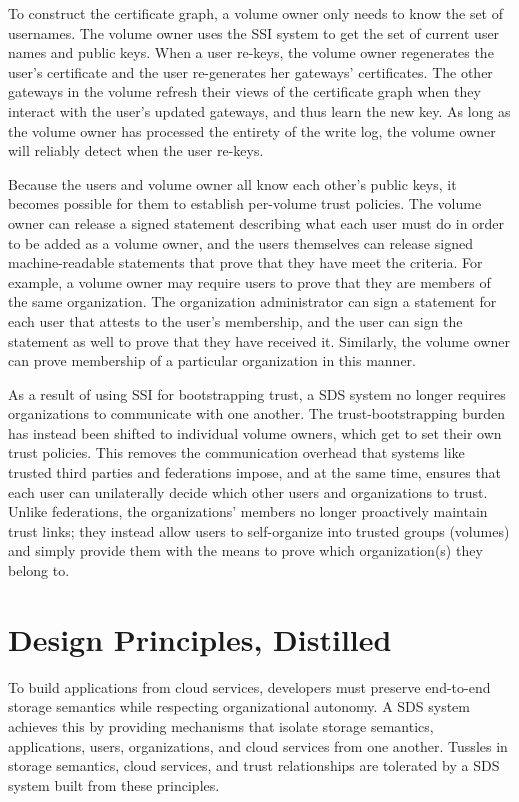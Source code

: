 To construct the certificate graph, a volume owner only needs to know the set of
usernames.  The volume owner uses the SSI system to get the set of current
user names and public keys.  When a user re-keys, the volume owner regenerates the user's
certificate and the user re-generates her gateways' certificates.  The other
gateways in the volume refresh their views of the certificate graph when they
interact with the user's updated gateways, and thus learn the new key.
As long as the volume owner has
processed the entirety of the write log, the volume owner will reliably detect
when the user re-keys.

Because the users and volume owner all know each other's public keys, it becomes
possible for them to establish per-volume trust policies.  The volume owner
can release a signed statement describing what each user must do in order to be
added as a volume owner, and the users themselves can release signed
machine-readable statements that prove that they have meet the criteria.  For example, a volume owner may
require users to prove that they are members of the same organization.  The
organization administrator can sign a statement for each user that attests to the user's
membership, and the user can sign the statement as well to prove that they have
received it.  Similarly, the volume owner can prove membership of a particular
organization in this manner.

As a result of using SSI for bootstrapping trust, a SDS system no longer requires
organizations to communicate with one another.
The trust-bootstrapping burden has instead been shifted to individual volume
owners, which get to set their own trust policies.  This removes the
communication overhead that systems like trusted third parties and federations
impose, and at the same time, ensures that each user can unilaterally decide
which other users and organizations to trust.  Unlike federations, the 
organizations' members no longer proactively maintain trust links; they instead allow
users to self-organize into trusted groups (volumes) and simply provide them
with the means to prove which organization(s) they belong to.

\section{Design Principles, Distilled}

To build applications from cloud services, developers must preserve
end-to-end storage semantics while respecting organizational autonomy.
A SDS system achieves this by providing mechanisms that isolate storage semantics, applications,
users, organizations, and cloud services from one another.  Tussles in storage
semantics, cloud services, and trust relationships are tolerated by a SDS system
built from these principles.

